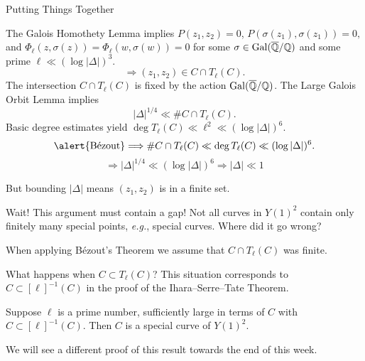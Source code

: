 \documentclass{beamer}
\begin{document}
\begin{frame}{Putting Things Together}
  
  The \alert{Galois Homothety Lemma} implies $P(z_1,z_2)=0$, $P(\sigma(z_1),\sigma(z_1))=0,$
  and $\Phi_\ell(z,\sigma(z))=\Phi_\ell(w,\sigma(w))=0$ for some
  $\sigma\in\mathrm{Gal}({\overline{\mathbb{Q}}}/{\mathbb{Q}})$ and some prime
  $\ell \ll (\log|\Delta|)^3$. 
  \begin{equation*}
    \Longrightarrow (z_1,z_2) \in C \cap T_\ell(C).
  \end{equation*}
  The
  intersection $C\cap T_\ell(C)$ is {fixed} by the action
  $\mathrm{Gal}({\overline{\mathbb{Q}}}/{\mathbb{Q}})$. The \alert{Large Galois Orbit Lemma} implies
  \begin{equation}
      |\Delta|^{1/4} \ll \# C\cap
    T_\ell(C).
  \end{equation}
  Basic degree estimates  yield $\deg T_\ell(C) \ll \ell^2 \ll (\log|\Delta|)^6$.
  \begin{equation*}
    \text{\alert{B\'ezout}} \Longrightarrow \# C\cap T_\ell(C) \ll \deg
    T_{\ell}(C)\ll (\log|\Delta|)^6.
  \end{equation*}
  \begin{equation*}
    \Longrightarrow
    |\Delta|^{1/4} \ll (\log |\Delta|)^6 \Longrightarrow |\Delta|\ll 1
  \end{equation*}

  But bounding $|\Delta|$ means $(z_1,z_2)$ is in a finite set. 
\end{frame}

\begin{frame}{Wait!}
  This argument must contain a \alert{gap}! Not all curves in $Y(1)^2$
  contain only finitely many special points, \textit{e.g.}, special
  curves.  Where did it go wrong?

  When applying B\'ezout's Theorem we assume that $C\cap T_\ell(C)$
  was finite.

  What happens when $C\subset T_\ell(C)$? This situation corresponds
  to $C\subset [\ell]^{-1}(C)$ in the proof of the
  Ihara--Serre--Tate Theorem. 

  \begin{theorem}[Edixhoven]
    Suppose $\ell$ is a prime number, sufficiently large in terms of
    $C$ with $C\subset [\ell]^{-1}(C)$. Then $C$ is a special curve of
    $Y(1)^2$. 
  \end{theorem}

  We will see a different proof of this result towards the end of this
  week.   
\end{frame}
\end{document}
